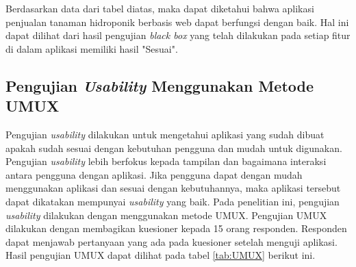
\par Berdasarkan data dari tabel diatas, maka dapat diketahui bahwa aplikasi penjualan tanaman hidroponik berbasis web dapat berfungsi dengan baik. Hal ini dapat dilihat dari hasil pengujian \textit{black box} yang telah dilakukan pada setiap fitur di dalam aplikasi memiliki hasil "Sesuai".

\subsection{Pengujian \textit{Usability} Menggunakan Metode UMUX}
Pengujian \textit{usability} dilakukan untuk mengetahui aplikasi yang sudah dibuat apakah sudah sesuai dengan kebutuhan pengguna dan mudah untuk digunakan. Pengujian \textit{usability} lebih berfokus kepada tampilan dan bagaimana interaksi antara pengguna dengan aplikasi. Jika pengguna dapat dengan mudah menggunakan aplikasi dan sesuai dengan kebutuhannya, maka aplikasi tersebut dapat dikatakan mempunyai \textit{usability} yang baik. Pada penelitian ini, pengujian \textit{usability} dilakukan dengan menggunakan metode UMUX. Pengujian UMUX dilakukan dengan membagikan kuesioner kepada 15 orang responden. Responden dapat menjawab pertanyaan yang ada pada kuesioner setelah menguji aplikasi. Hasil pengujian UMUX dapat dilihat pada tabel \ref*{tab:UMUX} berikut ini.

